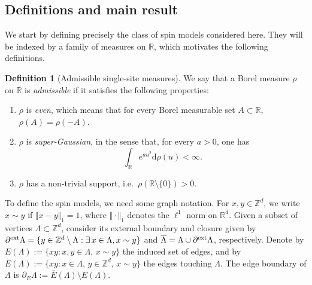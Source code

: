 \documentclass[11pt,a4paper]{article}
\numberwithin{equation}{section}
\theoremstyle{plain}
\theoremstyle{definition}
\newtheorem{Def}[Thm]{Definition}
\begin{document}
\subsection{Definitions and main result}

We start by defining precisely the class of spin models considered here. They will be indexed by a family of measures on $\mathbb R$, which motivates the following definitions.

\begin{Def}[Admissible single-site measures]\label{def:single site} We say that a Borel measure $\rho$ on $\mathbb R$ is \emph{admissible} if it satisfies the following properties:
\begin{enumerate}
    \item[$(i)$] $\rho$ is \emph{even}, which means that for every Borel measurable set $A\subset \mathbb R$, $\rho(A)=\rho(-A)$. 
    \item[$(ii)$] $\rho$ is \emph{super-Gaussian}, in the sense that, for every $a>0$, one has
    \begin{equation}
        \int_{\mathbb R}e^{au^2}\mathrm{d}\rho(u)<\infty.
    \end{equation}
    \item[$(iii)$] $\rho$ has a non-trivial support, i.e.\ $\rho(\mathbb{R}\setminus\{0\})>0$.
\end{enumerate}
\end{Def}

To define the spin models, we need some graph notation. For $x,y\in \mathbb Z^d$, we write $x\sim y$ if $\Vert x-y\Vert_1=1$, where $\Vert \cdot \Vert_1$ denotes the $\ell^1$ norm on $\mathbb R^d$. Given a subset of vertices $\Lambda\subset \mathbb{Z}^d$, consider its external boundary and closure given by $\partial^{\textup{ext}}\Lambda = \{y\in\mathbb{Z}^d\setminus \Lambda : \exists \, x\in\Lambda, x\sim y\}$ and $\overline{\Lambda} = \Lambda\cup \partial^{\textup{ext}}\Lambda$, respectively. Denote by $E(\Lambda):= \{ xy : x,y \in \Lambda,\, x\sim y\}$ the induced set of edges, and by $\overline E(\Lambda) := \{ xy : x \in \Lambda, \, y \in \mathbb Z^d,\, x\sim y \}$ the edges touching $\Lambda$. The edge boundary of $\Lambda$ is $\partial_E \Lambda:= \overline E(\Lambda) \setminus E(\Lambda)$.
\end{document}
